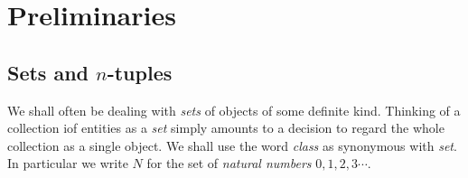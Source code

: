 \documentclass[12pt,a4paper,twoside,openany]{book}
\begin{document}

\restoregeometry
\thispagestyle{empty}
\setcounter{page}{0}
\tableofcontents
\thispagestyle{empty}
\setcounter{page}{0}


\chapter{Preliminaries}
\section{Sets and $n$-tuples}

We shall often be dealing with \textit{sets} of objects of some definite kind. Thinking of a collection iof entities as a \textit{set} simply amounts to a decision to regard the whole collection as a single object. We shall use the word \textit{class} as synonymous with \textit{set}. In particular we write $N$ for the set of \textit{natural numbers} $0,1,2,3\cdots$.
\end{document}
